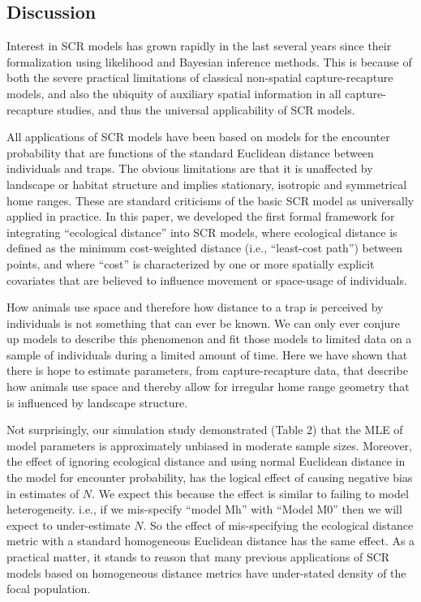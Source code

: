 \documentclass[12pt]{article}
\begin{document}
\begin{spacing}{1.8}
\section{Discussion}

Interest in SCR models has grown rapidly in the last several years
since their formalization using likelihood
\citep{borchers_efford:2008} and Bayesian \citep{royle_young:2008}
inference methods. This is because of both the severe practical
limitations of classical non-spatial capture-recapture models, and
also the ubiquity of auxiliary spatial information in all
capture-recapture studies, and thus the universal applicability of SCR
models.

All applications of SCR models have been based on models for the
encounter probability that are functions of the standard Euclidean
distance between individuals and traps. The obvious limitations are
that it is unaffected by landscape or habitat structure and implies
stationary, isotropic and symmetrical home ranges. These are standard
criticisms of the basic SCR model as universally applied in practice.
In this paper, we developed the first formal framework for integrating
``ecological distance'' into SCR models, where ecological distance is
defined as the minimum cost-weighted distance (i.e., ``least-cost
path'') between points, and where ``cost'' is characterized by one or
more spatially explicit covariates that are believed to influence
movement or space-usage of individuals.

How animals use space and therefore how distance to a trap is
perceived by individuals is not something that can ever be known. We
can only ever conjure up models to describe this phenomenon and fit
those models to limited data on a sample of individuals during a
limited amount of time.  Here we have shown that there is hope to
estimate parameters, from capture-recapture data, that describe how
animals use space and thereby allow for irregular home range geometry
that is influenced by landscape structure.

Not surprisingly, our simulation study demonstrated
(Table 2) that the MLE of model parameters is
approximately unbiased in moderate sample sizes. Moreover, the effect
of ignoring ecological distance and using normal Euclidean distance in
the model for encounter probability, has the logical effect of causing
negative bias in estimates of $N$.  We expect this because the effect
is similar to failing to model heterogeneity. i.e., if we mis-specify
``model Mh'' \citep{otis_etal:1978} with ``Model M0''
\citep{otis_etal:1978} then we will expect to under-estimate $N$. So
the effect of mis-specifying the ecological distance metric with a
standard homogeneous Euclidean distance has the same effect. As a
practical matter, it stands to reason that many previous applications
of SCR models based on homogeneous distance metrics have under-stated
density of the focal population.


\end{spacing}
\end{document}
